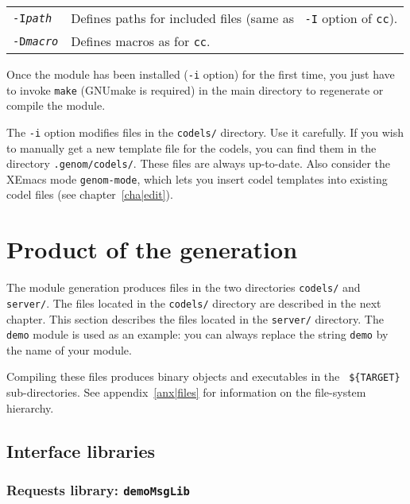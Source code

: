 \begin{description}
\begin{tabularx}{\linewidth}{lX}
{\tt -I{\em path}} & Defines paths for included files (same as {\tt
-I} option of {\tt cc}).\\

{\tt -D{\em macro}} & Defines macros as for {\tt cc}.\\
\end{tabularx}

Once the module has been installed ({\tt -i} option)  for the first time,
you just   have to invoke {\tt make}   (GNUmake is required)  in the main
directory to regenerate or compile the module.

The {\tt -i} option modifies files in the {\tt codels/} directory. Use it
carefully.  If you wish  to manually  get a  new   template file for  the
codels, you can find them in the directory {\tt .genom/codels/}.  These files
are always  up-to-date. Also consider the  XEmacs  mode {\tt genom-mode},
which lets  you  insert codel templates  into  existing codel files  (see
chapter~\ref{cha|edit}).

\end{description}


\section{Product of the generation}

The module generation produces files in the two directories {\tt codels/}
and {\tt server/}.  The files located  in the  {\tt codels/}  directory are
described in the next chapter.  This  section describes the files located
in  the  {\tt server/} directory.   The {\tt  demo} module   is  used as an
example: you can always replace the string {\tt demo} by the name of your
module.

Compiling these files produces binary objects and executables in the {\tt
\$\{TARGET\}} sub-\-directories. See appendix~\ref{anx|files} for
information on the file-system hierarchy.

\subsection{Interface libraries}

\subsubsection{Requests library: {\tt demoMsgLib}}

